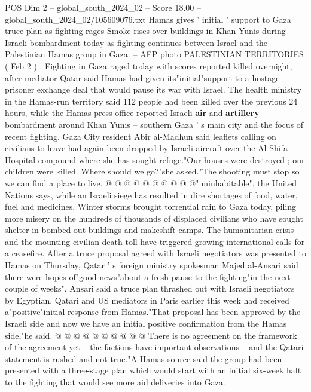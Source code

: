 \begin{textsample}{POS Dim 2 – global\_south\_2024\_02 – Score 18.00 – global\_south\_2024\_02/105609076.txt}  \label{ex:f2_pos_200}
Hamas gives ' initial ' support to Gaza truce plan as fighting rages Smoke rises over buildings in Khan Yunis during Israeli bombardment today as fighting continues between Israel and the Palestinian Hamas group in Gaza. -- AFP photo PALESTINIAN TERRITORIES ( Feb 2 ) : Fighting in Gaza raged today with scores reported killed overnight, after mediator Qatar said Hamas had given its"initial"support to a hostage-prisoner exchange deal that would pause its war with Israel.
The health ministry in the Hamas-run territory said 112 people had been killed over the previous 24 hours, while the Hamas press office reported Israeli \textbf{air} and \textbf{artillery} bombardment around Khan Yunis -- southern Gaza ' s main city and the focus of recent fighting.
Gaza City resident Abir al-Madhun said leaflets calling on civilians to leave had again been dropped by Israeli aircraft over the Al-Shifa Hospital compound where she has sought refuge."Our houses were destroyed ; our children were killed.
Where should we go?"she asked."The shooting must stop so we can find a place to live. @ @ @ @ @ @ @ @ @ @"uninhabitable", the United Nations says, while an Israeli siege has resulted in dire shortages of food, water, fuel and medicines.
Winter storms brought torrential rain to Gaza today, piling more misery on the hundreds of thousands of displaced civilians who have sought shelter in bombed out buildings and makeshift camps.
The humanitarian crisis and the mounting civilian death toll have triggered growing international calls for a ceasefire.
After a truce proposal agreed with Israeli negotiators was presented to Hamas on Thursday, Qatar ' s foreign ministry spokesman Majed al-Ansari said there were hopes of"good news"about a fresh pause to the fighting"in the next couple of weeks".
Ansari said a truce plan thrashed out with Israeli negotiators by Egyptian, Qatari and US mediators in Paris earlier this week had received a"positive"initial response from Hamas."That proposal has been approved by the Israeli side and now we have an initial positive confirmation from the Hamas side,"he said. @ @ @ @ @ @ @ @ @ @ There is no agreement on the framework of the agreement yet -- the factions have important observations -- and the Qatari statement is rushed and not true."A Hamas source said the group had been presented with a three-stage plan which would start with an initial six-week halt to the fighting that would see more aid deliveries into Gaza.

\end{textsample}

